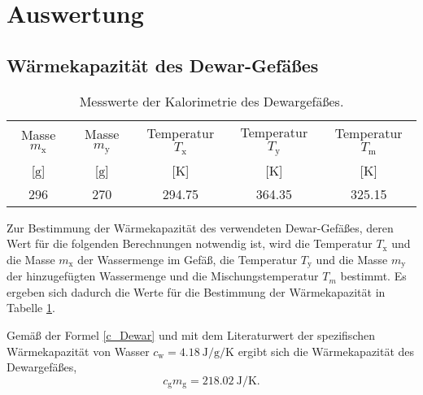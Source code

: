 \section{Auswertung}
\label{sec:Auswertung}
\subsection{Wärmekapazität des Dewar-Gefäßes}
\begin{table}[ht]
	\centering
	\begin{tabular}{ccccc}%
		\toprule
		{Masse $m_\text{x}$}& {Masse $m_\text{y}$}  &{Temperatur  $T_\text{x}$}&{Temperatur $T_\text{y}$}  &{Temperatur $T_\text{m}$}\\
		{[$\si{\gram}$]}& {[$\si{\gram}$]}  &{[$\si{\kelvin}$]}& {[$\si{\kelvin}$]}  &{[$\si{\kelvin}$}]\\
		\midrule
		296 & 270 & 294.75 & 364.35 & 325.15\\
		\bottomrule
	\end{tabular}
	\caption{Messwerte der Kalorimetrie des Dewargefäßes.}
	\label{tab:messung1}
\end{table}
Zur Bestimmung der Wärmekapazität des verwendeten Dewar-Gefäßes, deren Wert für die folgenden Berechnungen notwendig ist,
wird die Temperatur $T_\text{x}$ und die Masse $m_\text{x}$ der Wassermenge im Gefäß, die Temperatur $T_\text{y}$ und die Masse $m_\text{y}$ der hinzugefügten Wassermenge und die Mischungstemperatur $T_m$ bestimmt.
Es ergeben sich dadurch die Werte für die Bestimmung der Wärmekapazität in Tabelle \ref{tab:messung1}.

Gemäß der Formel \eqref{c_Dewar} und mit dem Literaturwert der spezifischen Wärmekapazität von Wasser
$c_\text{w}=\SI{4.18}{\joule\per\gram\per\kelvin}$\cite{V201} ergibt sich die Wärmekapazität des Dewargefäßes,
\begin{equation}
	c_\mathup{g}m_\mathup{g}=\SI{218.02}{\joule\per\kelvin}.
	\label{wert:waerme_dewar}
\end{equation}

